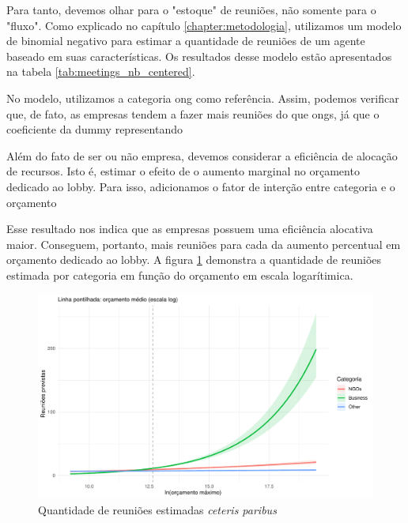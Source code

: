 Para tanto, devemos olhar para o "estoque" de reuniões, não somente para o "fluxo". Como explicado no capítulo \ref{chapter:metodologia}, utilizamos um modelo de binomial negativo para estimar a quantidade de reuniões de um agente baseado em suas características. Os resultados desse modelo estão apresentados na tabela \ref{tab:meetings_nb_centered}.

% 

No modelo, utilizamos a categoria \acrshort{ong} como referência. Assim, podemos verificar que, de fato, as empresas tendem a fazer mais reuniões do que \acrshort{ong}s, já que o coeficiente  da dummy representando

Além do fato de ser ou não empresa, devemos considerar a eficiência de alocação de recursos. Isto é, estimar o efeito de o aumento marginal no orçamento dedicado ao lobby. Para isso, adicionamos o fator de interção entre categoria e o orçamento 

Esse resultado nos indica que as empresas possuem uma eficiência alocativa maior. Conseguem, portanto, mais reuniões para cada da aumento percentual em orçamento dedicado ao lobby. A figura \ref{fig:h2_pred_meetings} demonstra a quantidade de reuniões estimada por categoria em função do orçamento em escala logarítimica.

\begin{figure}[htbp]
    \centering
    \includegraphics[width=\textwidth]{figures/h2_test/fig_pred_meetings_vs_budget_centered_by_category.pdf}
    \caption{Quantidade de reuniões estimadas \textit{ceteris paribus}}
    \label{fig:h2_pred_meetings}
    \note{}
\end{figure}

